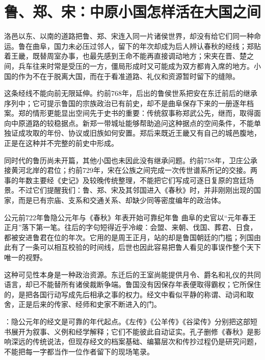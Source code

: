 \section{鲁、郑、宋：中原小国怎样活在大国之间}

洛邑以东、以南的道路把鲁、郑、宋连入同一片诸侯世界，却没有给它们同一种命运。鲁在曲阜，国力未必压过邻人，留下的年次却成为后人辨认春秋的经线；郑贴着王畿，既替周室办事，也最先感到王命不能再直接调动地方；宋夹在晋、楚之间，兵车往来时常是受压的一方，僵局形成时又可能成为双方都肯入席的地方。小国的作为不在于脱离大国，而在于看准道路、礼仪和资源暂时留下的缝隙。

这条经线不能向前无限延伸。约前768年，后出的鲁侯世系把安在东迁前后的继承序列中；它可提示鲁国的宗族政治已有前史，却不是曲阜保存下来的一册逐年档案。郑的情形更能显出空间先于史书的重要：传统叙事称郑武公先，继而，取得面向中原道路的较稳据点。新郑一带城址能够帮助追问这种据点的空间条件，不能单独证成攻取的年份、协议或旧族如何安置。郑后来既近王畿又有自己的城邑腹地，正是在这种并不完整的前史中形成。

同时代的鲁历尚未开篇，其他小国也未因此没有继承问题。约前758年，卫庄公承接黄河北岸的君位；约前729年，宋在公族之间完成一次传世谱系所记的交接。两事的年数主要经《史记》及较晚传统整理，不能把它们写成可逐日复原的宫廷场景。不过它们提醒我们：鲁、郑、宋及其邻国进入《春秋》时，并非刚刚出现的国家，而是已有宗庙、支系和交通关系、却缺少同等密度编年的政治体。

\begin{event}{公元前722年}{鲁隐公元年与《春秋》年表开始}{可靠纪年}{鲁}
曲阜的史官以“元年春王正月”落下第一笔。往后的字句短得近乎冷峻：会盟、来朝、伐国、葬君、日食，都被安进鲁君在位的年次。它用的是周王正月，站的却是鲁国朝廷的门槛；列国由此有了一条可以相互校验的时间线，后世也因此容易把鲁人看见的事误作整个天下唯一的视野。

这种可见性本身是一种政治资源。东迁后的王室尚能提供月令、爵名和礼仪的共同语言，却已不能替所有诸侯裁断争端。鲁国没有因保存年表便取得霸权；它所保住的，是把各国行动写成先后相承之事的权力。经文中看似平静的称谓、动词和取舍，正是后来的传家、经师和史家不断进入的门。

：隐公元年的经文是可靠的年代起点。《左传》《公羊传》《谷梁传》分别把这部短书展开为叙事、义例和经学解释；它们不能彼此自动证实。孔子删修《春秋》是影响深远的传统说法，但现存经文的档案基础、编纂层次和传抄过程仍是研究问题，不能把每一字都当作一位作者留下的现场笔录。
\end{event}

